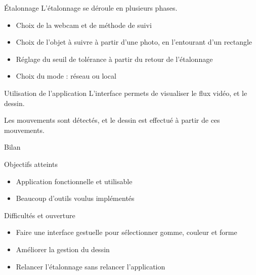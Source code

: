 \documentclass{beamer}
\begin{document}
		\begin{frame}{Étalonnage}
			L'étalonnage se déroule en plusieurs phases.
			\begin{itemize}
			\item Choix de la webcam et de méthode de suivi
			\item Choix de l'objet à suivre à partir d'une photo, en l'entourant d'un rectangle
			\item Réglage du seuil de tolérance à partir du retour de l'étalonnage
			\item Choix du mode : réseau ou local
			\end{itemize}
		\end{frame}
		
		\begin{frame}{Utilisation de l'application}
		L'interface permets de visualiser le flux vidéo, et le dessin.
		
		Les mouvements sont détectés, et le dessin est effectué à partir de ces mouvements.
		\end{frame}
		
		\begin{frame}{Bilan}
			\begin{exampleblock}{Objectifs atteints}
				\begin{itemize}
				\item Application fonctionnelle et utilisable
				\item Beaucoup d'outils voulus implémentés
				\end{itemize}
			\end{exampleblock}
			\pause
			\begin{alertblock}{Difficultés et ouverture}
				\begin{itemize}
				\item Faire une interface gestuelle pour sélectionner gomme, couleur et forme
				\item Améliorer la gestion du dessin
				\item Relancer l'étalonnage sans relancer l'application
				\end{itemize}
			\end{alertblock}
		\end{frame}

\end{document}
